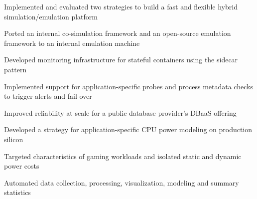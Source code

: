 \documentclass[]{deedy-resume-openfont}
\begin{document}
\vspace{\topsep}
\vspace{\topsep} %
{\normalsize
\begin{tightemize}
\item Implemented and evaluated two strategies to build a fast and flexible hybrid simulation/emulation platform
\item Ported an internal co-simulation framework and an open-source emulation framework to an internal emulation machine
\end{tightemize}
}

\vspace{\topsep}
\vspace{\topsep} %
{\normalsize
\begin{tightemize}
\item Developed monitoring infrastructure for stateful containers using the sidecar pattern
\item Implemented support for application-specific probes and process metadata checks to trigger alerts and fail-over
\item Improved reliability at scale for a public database provider's DBaaS offering
\end{tightemize}
}

\vspace{\topsep}
\vspace{\topsep} %
{\normalsize
\begin{tightemize}
\item Developed a strategy for application-specific CPU power modeling on production silicon
\item Targeted characteristics of gaming workloads and isolated static and dynamic power costs
\item Automated data collection, processing, visualization, modeling and summary statistics
\end{tightemize}
}
\sectionsep
\end{document}

